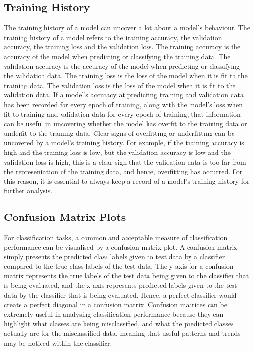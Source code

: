 \documentclass{l4proj}
\begin{document}
\subsection{Training History}
The training history of a model can uncover a lot about a model's behaviour.
The training history of a model refers to the training accuracy, the validation accuracy, the training loss and the validation loss.
The training accuracy is the accuracy of the model when predicting or classifying the training data.
The validation accuracy is the accuracy of the model when predicting or classifying the validation data.
The training loss is the loss of the model when it is fit to the training data.
The validation loss is the loss of the model when it is fit to the validation data.
If a model's accuracy at predicting training and validation data has been recorded for every epoch of training, along with the model's loss when fit to training and validation data for every epoch of training, that information can be useful in uncovering whether the model has overfit to the training data or underfit to the training data.
Clear signs of overfitting or underfitting can be uncovered by a model's training history.
For example, if the training accuracy is high and the training loss is low, but the validation accuracy is low and the validation loss is high, this is a clear sign that the validation data is too far from the representation of the training data, and hence, overfitting has occurred.
For this reason, it is essential to always keep a record of a model's training history for further analysis.

\subsection{Confusion Matrix Plots}
For classification tasks, a common and acceptable measure of classification performance can be visualised by a confusion matrix plot.
A confusion matrix simply presents the predicted class labels given to test data by a classifier compared to the true class labels of the test data.
The y-axis for a confusion matrix represents the true labels of the test data being given to the classifier that is being evaluated, and the x-axis represents predicted labels given to the test data by the classifier that is being evaluated.
Hence, a perfect classifier would create a perfect diagonal in a confusion matrix.
Confusion matrices can be extremely useful in analysing classification performance because they can highlight what classes are being misclassified, and what the predicted classes actually are for the misclassified data, meaning that useful patterns and trends may be noticed within the classifier.
\end{document}
